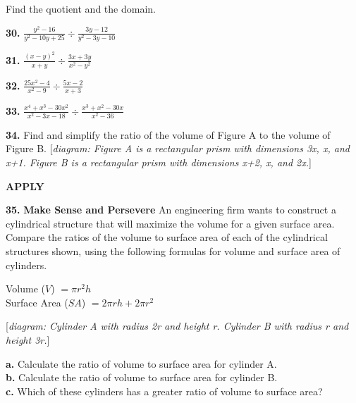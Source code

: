 \documentclass{article}
\newenvironment{practice}[2]{\textbf{#1.}}{\vspace{1em}}
\newcommand{\answer}[1]{}
\newcommand{\placeholder}[2]{[\textit{#1: #2}]}
\newcommand{\uncertain}[2]{#1}
\begin{document}
Find the quotient and the domain.

\begin{practice}{30}{\uncertain{?}{missing DOK}}
$\frac{y^2-16}{y^2-10y+25} \div \frac{3y-12}{y^2-3y-10}$
\answer{}
\end{practice}

\begin{practice}{31}{\uncertain{?}{missing DOK}}
$\frac{(x-y)^2}{x+y} \div \frac{3x+3y}{x^2-y^2}$
\answer{}
\end{practice}

\begin{practice}{32}{\uncertain{?}{missing DOK}}
$\frac{25x^2-4}{x^2-9} \div \frac{5x-2}{x+3}$
\answer{}
\end{practice}

\begin{practice}{33}{\uncertain{?}{missing DOK}}
$\frac{x^4+x^3-30x^2}{x^2-3x-18} \div \frac{x^3+x^2-30x}{x^2-36}$
\answer{}
\end{practice}

\begin{practice}{34}{\uncertain{?}{missing DOK}}
Find and simplify the ratio of the volume of Figure A to the volume of Figure B.
\placeholder{diagram}{Figure A is a rectangular prism with dimensions 3x, x, and x+1. Figure B is a rectangular prism with dimensions x+2, x, and 2x.}
\answer{}
\end{practice}

\textbf{APPLY}

\begin{practice}{35}{\uncertain{?}{missing DOK}}
\textbf{Make Sense and Persevere} An engineering firm wants to construct a cylindrical structure that will maximize the volume for a given surface area. Compare the ratios of the volume to surface area of each of the cylindrical structures shown, using the following formulas for volume and surface area of cylinders.

Volume ($V$) $= \pi r^2 h$ \\
Surface Area ($SA$) $= 2\pi rh + 2\pi r^2$

\placeholder{diagram}{Cylinder A with radius 2r and height r. Cylinder B with radius r and height 3r.}

\textbf{a.} Calculate the ratio of volume to surface area for cylinder A. \\
\textbf{b.} Calculate the ratio of volume to surface area for cylinder B. \\
\textbf{c.} Which of these cylinders has a greater ratio of volume to surface area?
\answer{}
\end{practice}
\end{document}
